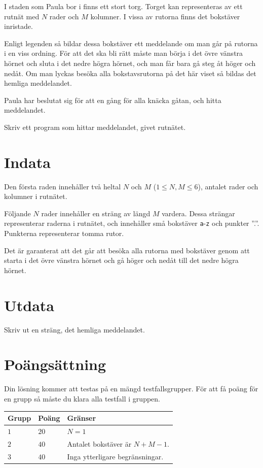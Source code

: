 \noindent
I staden som Paula bor i finns ett stort torg. Torget kan representeras av ett 
rutnät med $N$ rader och $M$ kolumner. I vissa av rutorna finns det bokstäver 
inristade. 

Enligt legenden så bildar dessa bokstäver ett meddelande om man 
går på rutorna i en viss ordning. För att det ska bli rätt måste man börja 
i det övre vänstra hörnet och sluta i det nedre högra hörnet, och man får bara gå steg åt höger 
och nedåt. Om man lyckas besöka alla bokstavsrutorna på det här viset så bildas 
det hemliga meddelandet. 

Paula har beslutat sig för att en gång för alla knäcka gåtan, och hitta meddelandet.

Skriv ett program som hittar meddelandet, givet rutnätet.

\section*{Indata}
Den första raden innehåller två heltal $N$ och $M$ ($1 \leq N,M \leq 6$), 
antalet rader och kolumner i rutnätet.

Följande $N$ rader innehåller en sträng av längd $M$ vardera. Dessa strängar 
representerar raderna i rutnätet, och innehåller små bokstäver \texttt{a}-\texttt{z} och punkter ''.''.
Punkterna representerar tomma rutor.

Det är garanterat att det går att besöka alla rutorna med bokstäver genom att 
starta i det övre vänstra hörnet och gå höger och nedåt till det nedre högra hörnet.

\section*{Utdata}
Skriv ut en sträng, det hemliga meddelandet.

\section*{Poängsättning}
Din lösning kommer att testas på en mängd testfallsgrupper.
För att få poäng för en grupp så måste du klara alla testfall i gruppen.

\noindent
\begin{tabular}{| l | l | p{12cm} |}
  \hline
  \textbf{Grupp} & \textbf{Poäng} & \textbf{Gränser} \\ \hline
  $1$    & $20$       & $N = 1$ \\ \hline
  $2$    & $40$       & Antalet bokstäver är $N+M-1$. \\ \hline
  $3$    & $40$       & Inga ytterligare begränsningar. \\ \hline
\end{tabular}

